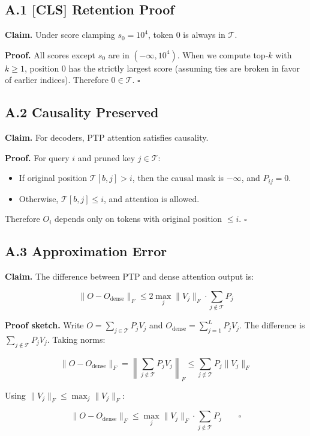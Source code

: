 \subsection{A.1 [CLS] Retention Proof}

\textbf{Claim.} Under score clamping $s_0 = 10^4$, token 0 is always in 
$\mathcal{T}$.

\textbf{Proof.} All scores except $s_0$ are in $(-\infty, 10^4)$. When we 
compute top-$k$ with $k \geq 1$, position 0 has the strictly largest 
score (assuming ties are broken in favor of earlier indices). Therefore 
$0 \in \mathcal{T}$. $\square$

\subsection{A.2 Causality Preserved}

\textbf{Claim.} For decoders, PTP attention satisfies causality.

\textbf{Proof.} For query $i$ and pruned key $j \in \mathcal{T}$:
\begin{itemize}
\item If original position $\mathcal{T}[b, j] > i$, then the causal mask is
  $-\infty$, and $P_{ij} = 0$.
\item Otherwise, $\mathcal{T}[b, j] \leq i$, and attention is allowed.

\end{itemize}
Therefore $O_i$ depends only on tokens with original position $\leq i$. 
$\square$

\subsection{A.3 Approximation Error}

\textbf{Claim.} The difference between PTP and dense attention output is:

\[
\|O - O_\text{dense}\|_F \leq 2 \max_j \|V_j\|_F \cdot \sum_{j \notin \mathcal{T}} P_j
\tag{A.1}
\]

\textbf{Proof sketch.} Write $O = \sum_{j \in \mathcal{T}} P_j V_j$ and 
$O_\text{dense} = \sum_{j=1}^L P_j V_j$. The difference is 
$\sum_{j \notin \mathcal{T}} P_j V_j$. Taking norms:

\[
\|O - O_\text{dense}\|_F = \left\|\sum_{j \notin \mathcal{T}} P_j V_j\right\|_F \leq \sum_{j \notin \mathcal{T}} P_j \|V_j\|_F
\]

Using $\|V_j\|_F \leq \max_j \|V_j\|_F$:

\[
\|O - O_\text{dense}\|_F \leq \max_j \|V_j\|_F \cdot \sum_{j \notin \mathcal{T}} P_j \qquad \square
\]

